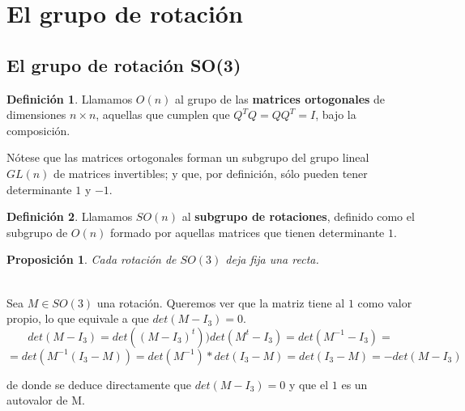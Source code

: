 \documentclass{article}
\theoremstyle{plain}
\newtheorem{proposition}{Proposición}
\theoremstyle{definition}
\newtheorem{definition}{Definición}
\theoremstyle{remark}
\begin{document}
\maketitle

\newpage
\tableofcontents
\newpage

\section{El grupo de rotación}
\subsection{El grupo de rotación SO(3)}

\begin{definition}
  Llamamos $O(n)$ al grupo de las \textbf{matrices ortogonales}
  de dimensiones $n \times n$, aquellas que cumplen que $Q^TQ = QQ^T = I$,
  bajo la composición.
\end{definition}

Nótese que las matrices ortogonales forman un subgrupo del grupo
lineal $GL(n)$ de matrices invertibles; y que, por definición, sólo
pueden tener determinante $1$ y $-1$.

\begin{definition}
  Llamamos $SO(n)$ al \textbf{subgrupo de rotaciones}, definido como
  el subgrupo de $O(n)$ formado por aquellas matrices que tienen
  determinante $1$.
\end{definition}



\begin{proposition}
	Cada rotación de $SO(3)$ deja fija una recta.
\end{proposition}

\begin{proofname}\\
	Sea $ M \in SO(3)$ una rotación. Queremos ver que la matriz tiene al $1$ como valor propio, lo que equivale a que
	$ det(M - I_3) = 0$.
	\[ det(M - I_3) = det((M - I_3)^t) ) det(M^t - I_3) = det(M^{-1} - I_3) = \]
	\[= det(M^{-1}(I_3 - M)) = det(M^{-1}) * det(I_3 - M) = det(I_3 - M) = -det(M - I_3) \]

	de donde se deduce directamente que $det(M - I_3) = 0$ y que el $1$ es un autovalor de M.
\end{proofname}


\end{document}
